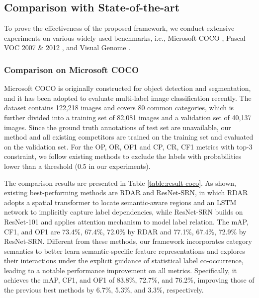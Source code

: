 \documentclass[10pt,twocolumn,letterpaper]{article}
\begin{document}
\begin{table*}[htp]
\begin{tabular}
\hline
\end{tabular}
\vspace{1pt}
\caption{Comparison of AP and mAP in \% of our model and state-of-the-art methods on the PASCAL VOC 2012 dataset. Upper part presents the results of single model and lower part presents those that aggregate multiple models.
``Ours'' and ``Ours (pre)'' denote our framework without and with pre-training on the COCO dataset. ``Ours (pre \& fusion)'' denotes fusing our two scale results.
The best and second best results are highlighted in {\color{red}{red}} and {\color{blue}{blue}}, respectively. Best viewed in color.}
\label{table:comparision_voc12}
\end{table*}

\subsection{Comparison with State-of-the-art}
To prove the effectiveness of the proposed framework, we conduct extensive experiments on various widely used benchmarks, i.e., Microsoft COCO \cite{lin2014microsoft}, Pascal VOC 2007 \& 2012 \cite{everingham2010pascal}, and Visual Genome \cite{krishna2017visual}.

\subsubsection{Comparison on Microsoft COCO}
Microsoft COCO \cite{lin2014microsoft} is originally constructed for object detection and segmentation, and it has been adopted to evaluate multi-label image classification recently. The dataset contains 122,218 images and covers 80 common categories, which is further divided into a training set of 82,081 images and a validation set of 40,137 images. Since the ground truth annotations of test set are unavailable, our method and all existing competitors are trained on the training set and evaluated on the validation set. For the OP, OR, OF1 and CP, CR, CF1 metrics with top-3 constraint, we follow existing methods \cite{wang2016cnn} to exclude the labels with probabilities lower than a threshold (0.5 in our experiments).

The comparison results are presented in Table \ref{table:result-coco}. As shown, existing best-performing methods are RDAR and ResNet-SRN, in which RDAR adopts a spatial transformer to locate semantic-aware regions and an LSTM network to implicitly capture label dependencies, while ResNet-SRN builds on ResNet-101 and applies attention mechanism to model label relation. The mAP, CF1, and OF1 are 73.4\%, 67.4\%, 72.0\% by RDAR and 77.1\%, 67.4\%, 72.9\% by ResNet-SRN. Different from these methods, our framework incorporates category semantics to better learn semantic-specific feature representations and explores their interactions under the explicit guidance of statistical label co-occurrence, leading to a notable performance improvement on all metrics. Specifically, it achieves the mAP, CF1, and OF1 of 83.8\%, 72.7\%, and 76.2\%, improving those of the previous best methods by 6.7\%, 5.3\%, and 3.3\%, respectively.
\end{document}
